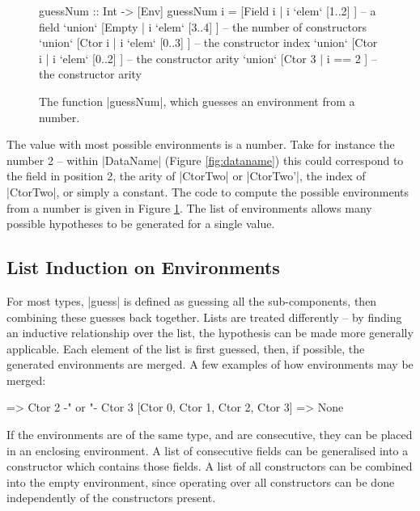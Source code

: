 \documentclass{llncs}
\begin{document}
\begin{figure}[t]
\begin{code}
guessNum :: Int -> [Env]
guessNum i  =        [Field i  | i `elem` [1..2]  ]  -- a field
            `union`  [Empty    | i `elem` [3..4]  ]  -- the number of constructors
            `union`  [Ctor i   | i `elem` [0..3]  ]  -- the constructor index
            `union`  [Ctor i   | i `elem` [0..2]  ]  -- the constructor arity
            `union`  [Ctor 3   | i == 2           ]  -- the constructor arity
\end{code}
\caption{The function |guessNum|, which guesses an environment from a number.}
\label{fig:guessnum}
\end{figure}

The value with most possible environments is a number. Take for instance the number 2 -- within |DataName| (Figure \ref{fig:dataname}) this could correspond to the field in position 2, the arity of |CtorTwo| or |CtorTwo'|, the index of |CtorTwo|, or simply a constant. The code to compute the possible environments from a number is given in Figure \ref{fig:guessnum}. The list of environments allows many possible hypotheses to be generated for a single value.


\subsection{List Induction on Environments}
\label{sec:induction}

For most types, |guess| is defined as guessing all the sub-components, then combining these guesses back together. Lists are treated differently -- by finding an inductive relationship over the list, the hypothesis can be made more generally applicable. Each element of the list is first guessed, then, if possible, the generated environments are merged. A few examples of how environments may be merged:

\begin{code}
                => Ctor 2 {-" \;\; or \;\; "-} Ctor 3
[Ctor 0, Ctor 1, Ctor 2, Ctor 3]  => None
\end{code}

If the environments are of the same type, and are consecutive, they can be placed in an enclosing environment. A list of consecutive fields can be generalised into a constructor which contains those fields. A list of all constructors can be combined into the empty environment, since operating over all constructors can be done independently of the constructors present.
\end{document}
